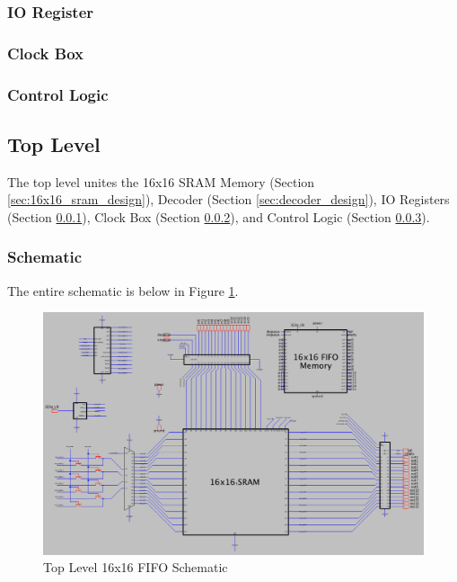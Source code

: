 \documentclass[a4paper]{article}
\begin{document}
\subsubsection{IO Register}
\label{sec:io_register_design}

\subsubsection{Clock Box}
\label{sec:clock_box_design}

\subsubsection{Control Logic}
\label{sec:control_logic_design}

\newpage
\subsection{Top Level}
The top level unites the 16x16 SRAM Memory (Section \ref{sec:16x16_sram_design}), Decoder (Section \ref{sec:decoder_design}), IO Registers (Section \ref{sec:io_register_design}), Clock Box (Section \ref{sec:clock_box_design}), and Control Logic (Section \ref{sec:control_logic_design}). 

\subsubsection{Schematic}
The entire schematic is below in Figure \ref{fig:topLevelSchematic}.

\begin{figure}[H]
	\centering
	\includegraphics[scale=0.3]{topLevelSchematic}
	\caption{Top Level 16x16 FIFO Schematic}
	\label{fig:topLevelSchematic}
\end{figure}
\end{document}
